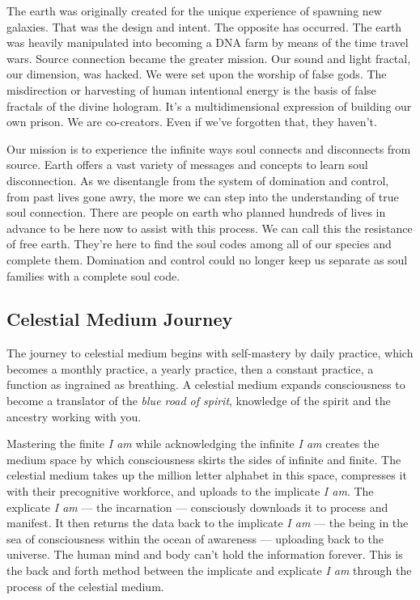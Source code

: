 The earth was originally created for the unique experience of spawning
new galaxies. That was the design and intent. The opposite has occurred.
The earth was heavily manipulated into becoming a DNA farm by means of
the time travel wars. Source connection became the greater mission. Our
sound and light fractal, our dimension, was hacked. We were set upon the
worship of false gods. The misdirection or harvesting of human
intentional energy is the basis of false fractals of the divine
hologram. It's a multidimensional expression of building our own prison.
We are co-creators. Even if we've forgotten that, they haven't.

Our mission is to experience the infinite ways soul connects and
disconnects from source. Earth offers a vast variety of messages and
concepts to learn soul disconnection. As we disentangle from the system
of domination and control, from past lives gone awry, the more we can
step into the understanding of true soul connection. There are people on
earth who planned hundreds of lives in advance to be here now to assist
with this process. We can call this the resistance of free earth.
They're here to find the soul codes among all of our species and
complete them. Domination and control could no longer keep us separate
as soul families with a complete soul code.

\subsection{Celestial Medium Journey}\label{celestial-medium-journey}

The journey to celestial medium begins with self-mastery by daily
practice, which becomes a monthly practice, a yearly practice, then a
constant practice, a function as ingrained as breathing. A celestial
medium expands consciousness to become a translator of the \emph{blue
road of spirit}, knowledge of the spirit and the ancestry working with
you.

Mastering the finite \emph{I am} while acknowledging the infinite
\emph{I am} creates the medium space by which consciousness skirts the
sides of infinite and finite. The celestial medium takes up the million
letter alphabet in this space, compresses it with their precognitive
workforce, and uploads to the implicate \emph{I am}. The explicate
\emph{I am} --- the incarnation --- consciously downloads it to process
and manifest. It then returns the data back to the implicate \emph{I am}
--- the being in the sea of consciousness within the ocean of awareness
--- uploading back to the universe. The human mind and body can't hold
the information forever. This is the back and forth method between the
implicate and explicate \emph{I am} through the process of the celestial
medium.

